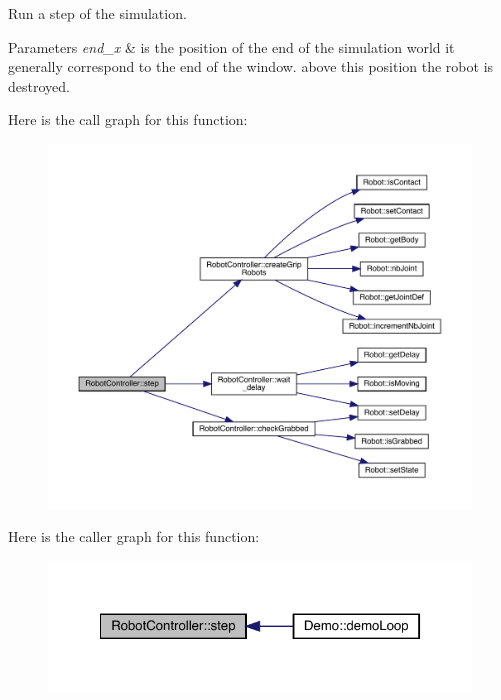 Run a step of the simulation. 
\begin{DoxyParams}{Parameters}
{\em end\+\_\+x} & is the position of the end of the simulation world it generally correspond to the end of the window. above this position the robot is destroyed. \\
\hline
\end{DoxyParams}
Here is the call graph for this function\+:\nopagebreak
\begin{figure}[H]
\begin{center}
\leavevmode
\includegraphics[width=350pt]{class_robot_controller_ab2e4091fc2e47701cc5dbd7c2d9fc649_cgraph}
\end{center}
\end{figure}
Here is the caller graph for this function\+:\nopagebreak
\begin{figure}[H]
\begin{center}
\leavevmode
\includegraphics[width=322pt]{class_robot_controller_ab2e4091fc2e47701cc5dbd7c2d9fc649_icgraph}
\end{center}
\end{figure}
\mbox{\label{class_robot_controller_ae433d7a77a59e8eced35fc4885051805}} 
